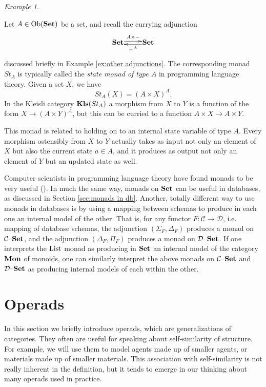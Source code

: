 \documentclass{book}
\makeatletter
\def\tn{\textnormal}
\def\mc{\mathcal}
\def\List{\tn{List}}
\def\Ob{\tn{Ob}}
\def\to{\rightarrow}
\def\taking{\colon}
\newcommand{\Adjoint}[4]{\xymatrix@1{#2 \ar@<.5ex>[r]^-{#1} & #3 \ar@<.5ex>[l]^-{#4}}}
\def\Mon{{\bf Mon}}
\def\Kls{{\bf Kls}}
\def\Set{{\bf Set}}
\def\set{{\text \textendash}{\bf Set}}
\def\mcC{\mc{C}}
\def\mcD{\mc{D}}
\theoremstyle{remark}
\newtheorem{example}[subsubsection]{Example}
\theoremstyle{definition}
\makeatother
\begin{document}
\begin{example}\label{ex:currying gives state}

Let $A\in\Ob(\Set)$ be a set, and recall the currying adjunction 
$$\Adjoint{A\times-}{\Set}{\Set}{-^A}$$
discussed briefly in Example \ref{ex:other adjunctions}. The corresponding monad $St_A$ is typically called the {\em state monad of type $A$} in programming language theory. Given a set $X$, we have $$St_A(X)=(A\times X)^A.$$ In the Kleisli category $\Kls(St_A)$ a morphism from $X$ to $Y$ is a function of the form $X\to (A\times Y)^A$, but this can be curried to a function $A\times X\to A\times Y$. 

This monad is related to holding on to an internal state variable of type $A$. Every morphism ostensibly from $X$ to $Y$ actually takes as input not only an element of $X$ but also the current state $a\in A$, and it produces as output not only an element of $Y$ but an updated state as well.

\end{example}

Computer scientists in programming language theory have found monads to be very useful (\cite{Mog}). In much the same way, monads on $\Set$ can be useful in databases, as discussed in Section \ref{sec:monads in db}. Another, totally different way to use monads in databases is by using a mapping between schemas to produce in each one an internal model of the other. That is, for any functor $F\taking\mcC\to\mcD$, i.e. mapping of database schemas, the adjunction $(\Sigma_F,\Delta_F)$ produces a monad on $\mcC\set$, and the adjunction $(\Delta_F,\Pi_F)$ produces a monad on $\mcD\set$. If one interprets the $\List$ monad as producing in $\Set$ an internal model of the category $\Mon$ of monoids, one can similarly interpret the above monads on $\mcC\set$ and $\mcD\set$ as producing internal models of each within the other.


\section{Operads}\label{sec:operad}

In this section we briefly introduce operads, which are generalizations of categories. They often are useful for speaking about self-similarity of structure. For example, we will use them to model agents made up of smaller agents, or materials made up of smaller materials. This association with self-similarity is not really inherent in the definition, but it tends to emerge in our thinking about many operads used in practice. 
\end{document}
